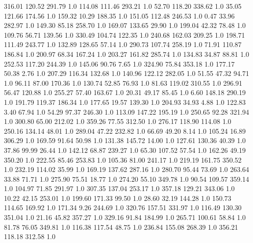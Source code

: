  316.01   120.52   291.79  1.0
  114.08   111.46   293.21  1.0
   52.70   118.20   338.62  1.0
   35.05   121.66   174.56  1.0
  159.32    10.29   188.35  1.0
  151.05   112.48   246.53  1.0
    0.47    33.96   282.97  1.0
  149.30    85.18   258.70  1.0
  169.07   133.65    29.90  1.0
  199.04    42.32    78.48  1.0
  109.76    56.71   139.56  1.0
  330.49   104.74   122.35  1.0
  240.68   162.03   209.25  1.0
  198.71   111.49   243.77  1.0
  132.89   128.65    57.14  1.0
  290.73   107.74   258.19  1.0
   71.91   110.87   186.84  1.0
  200.97    68.34   167.24  1.0
  203.27   161.82   285.74  1.0
  134.83    34.87    88.81  1.0
  252.53   117.20   244.39  1.0
  145.06    90.76     7.65  1.0
  324.90    75.84   353.18  1.0
  177.17    50.38     2.76  1.0
  207.29   116.34   132.68  1.0
  140.96   122.12   282.05  1.0
   51.55    47.32    94.71  1.0
   96.11    87.00   170.36  1.0
  130.74    52.85    76.93  1.0
   81.63   119.02   310.55  1.0
  296.91    56.47   120.88  1.0
  255.27    57.40   163.67  1.0
   20.31    49.17    85.45  1.0
    6.60   148.18   290.19  1.0
  191.79   119.37   186.34  1.0
  177.65    19.57   139.30  1.0
  204.93    34.93     4.88  1.0
  122.83     3.40    67.94  1.0
   54.29    97.37   246.30  1.0
  113.09   147.22   195.19  1.0
  250.65    92.28   321.94  1.0
  300.80    65.00   212.02  1.0
  359.26    77.55   312.50  1.0
  276.17   118.90   114.08  1.0
  250.16   134.14    48.01  1.0
  289.04    47.22   232.82  1.0
   66.69    49.20     8.14  1.0
  105.24    16.89   306.29  1.0
  169.59    91.64    50.98  1.0
  131.38   145.72    14.00  1.0
  127.61   130.36    40.39  1.0
   37.86    99.99    26.44  1.0
  142.12    68.87   239.27  1.0
   65.30   107.52    57.54  1.0
  162.26    49.19   350.20  1.0
  222.55    85.46   253.83  1.0
  105.36    81.00   241.17  1.0
  219.19   161.75   350.52  1.0
  232.19   114.02    35.99  1.0
  169.19   137.62   287.16  1.0
  280.70    95.44    73.69  1.0
  263.64    33.88    71.71  1.0
  275.90    75.51    18.77  1.0
  274.20    55.10   349.78  1.0
   90.54   109.57   359.14  1.0
  104.97    71.85   291.97  1.0
  307.35   137.04   253.17  1.0
  357.18   129.21   343.06  1.0
   10.22    42.15   253.01  1.0
  199.60   171.33    99.50  1.0
   28.60    32.19   144.28  1.0
  150.73   114.65   169.92  1.0
  171.34     9.26   244.69  1.0
  320.76   157.51   331.97  1.0
  116.49   130.30   351.04  1.0
   21.16    45.82   357.27  1.0
  329.16    91.84   184.99  1.0
  265.71   100.61    58.84  1.0
   81.78    76.05   349.81  1.0
  116.38   117.54    48.75  1.0
  236.84   155.08   268.39  1.0
  356.21   118.18   312.58  1.0
